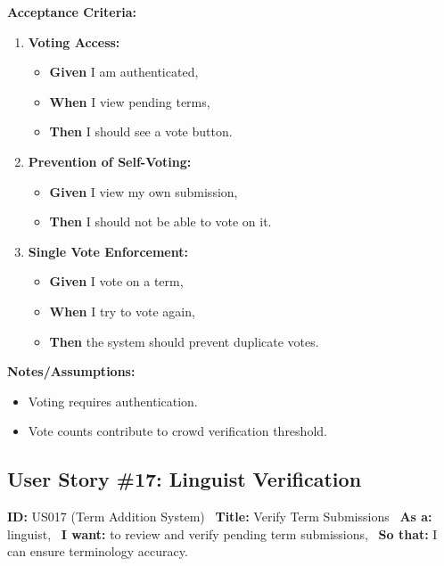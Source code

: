 \documentclass[12pt]{article}
\begin{document}
\vspace{1em}
\textbf{Acceptance Criteria:}
\begin{enumerate}
\item \textbf{Voting Access:}
\begin{itemize}
\item \textbf{Given} I am authenticated,
\item \textbf{When} I view pending terms,
\item \textbf{Then} I should see a vote button.
\end{itemize}

\item \textbf{Prevention of Self-Voting:}
\begin{itemize}
    \item \textbf{Given} I view my own submission,
    \item \textbf{Then} I should not be able to vote on it.
\end{itemize}

\item \textbf{Single Vote Enforcement:}
\begin{itemize}
    \item \textbf{Given} I vote on a term,
    \item \textbf{When} I try to vote again,
    \item \textbf{Then} the system should prevent duplicate votes.
\end{itemize}
\end{enumerate}

\vspace{1em}
\textbf{Notes/Assumptions:}
\begin{itemize}
\item Voting requires authentication.
\item Vote counts contribute to crowd verification threshold.
\end{itemize}

\subsection{User Story \#17: Linguist Verification}
\textbf{ID:} US017 (Term Addition System) \
\textbf{Title:} Verify Term Submissions \
\textbf{As a:} linguist, \
\textbf{I want:} to review and verify pending term submissions, \
\textbf{So that:} I can ensure terminology accuracy.
\end{document}
